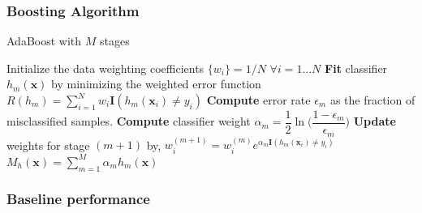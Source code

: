 \documentclass[pdf]{beamer}
\begin{document}
\begin{frame}
\frametitle{Boosting Algorithm}
\begin{algorithm}[H]
\caption{AdaBoost with $M$ stages}
\begin{algorithmic}[1]
\STATE Initialize the data weighting coefficients $\{ w_{i}\} = 1/N$ $\forall i=1...N$  
\STATE \textbf{Fit} classifier $h_{m}(\mathbf{x})$ by minimizing the weighted error function $R(h_{m}) = \sum_{i=1}^{N}w_{i}\mathbf{I}(h_{m}(\mathbf{x}_{i}) \neq y_{i})$ 
\STATE \textbf{Compute} error rate $\epsilon_{m}$ as the fraction of misclassified samples.
\STATE \textbf{Compute} classifier weight $\alpha_{m} = \dfrac{1}{2}\ln\bigg(\dfrac{1-\epsilon_{m}}{\epsilon_{m}}\bigg)$
\STATE \textbf{Update} weights for stage $(m+1)$ by, $w_{i}^{(m+1)} = w_{i}^{(m)}e^{\alpha_{m}\mathbf{I}(h_{m}(\mathbf{x}_{i}) \neq y_{i})}$ 
\ENDFOR
\STATE $M_{h}(\textbf{x}) = \sum_{m=1}^{M}\alpha_{m}h_{m}(\mathbf{x})$   
\RETURN 
\end{algorithmic}
\label{ada}
\end{algorithm}
\end{frame}

\begin{frame}
\frametitle{Baseline performance}
\begin{center}
\begin{table}[H]
\label{pr}
\end{table}
\end{center}
\end{frame}
\end{document}
